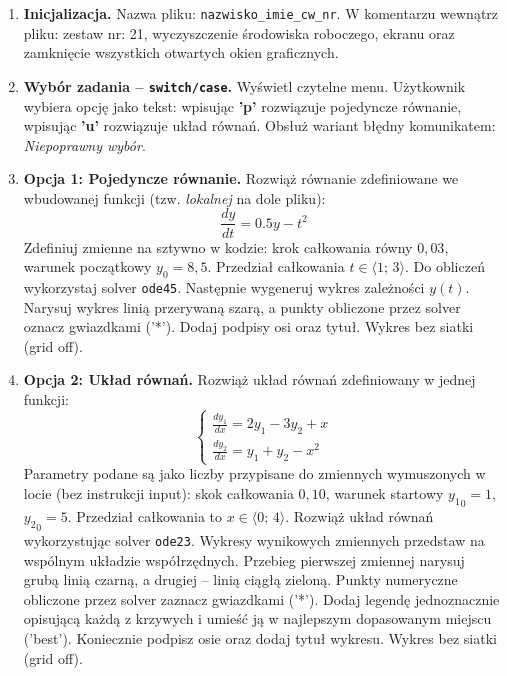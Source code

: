 \documentclass[a4paper,11pt]{article}
\begin{document}
\begin{enumerate}[leftmargin=*, label=\textbf{\arabic*.}, itemsep=2pt]

  \item \textbf{Inicjalizacja.}
    Nazwa pliku: \texttt{nazwisko\_imie\_cw\_nr}. W komentarzu wewnątrz pliku: zestaw nr: 21, wyczyszczenie środowiska roboczego, ekranu oraz zamknięcie wszystkich otwartych okien graficznych.

  \item \textbf{Wybór zadania -- \texttt{switch/case}.}
    Wyświetl czytelne menu. Użytkownik wybiera opcję jako tekst: wpisując \textbf{'p'} rozwiązuje pojedyncze równanie, wpisując \textbf{'u'} rozwiązuje układ równań. Obsłuż wariant błędny komunikatem: \textit{Niepoprawny wybór}.

  \item \textbf{Opcja 1: Pojedyncze równanie.}
    Rozwiąż równanie zdefiniowane we wbudowanej funkcji (tzw. \textit{lokalnej} na dole pliku):
    \[ \frac{dy}{dt} = 0.5y - t^2 \]
    Zdefiniuj zmienne na sztywno w kodzie: krok całkowania równy $0{,}03$, warunek początkowy $y_0 = 8{,}5$. Przedział całkowania $t \in \langle 1;\,3 \rangle$.
    Do obliczeń wykorzystaj solver \texttt{ode45}. Następnie wygeneruj wykres zależności $y(t)$. Narysuj wykres linią przerywaną szarą, a punkty obliczone przez solver oznacz gwiazdkami ('*'). Dodaj podpisy osi oraz tytuł. Wykres bez siatki (grid off).

  \item \textbf{Opcja 2: Układ równań.}
    Rozwiąż układ równań zdefiniowany w jednej funkcji:\\[-0.5em]
    \[
    \begin{cases}
      \frac{dy_1}{dx} = 2y_1 - 3y_2 + x \\
      \frac{dy_2}{dx} = y_1 + y_2 - x^2
    \end{cases}
    \]
    Parametry podane są jako liczby przypisane do zmiennych wymuszonych w locie (bez instrukcji input): skok całkowania $0{,}10$, warunek startowy $ {y_1}_{0} = 1 $, $ {y_2}_{0} = 5 $. Przedział całkowania to $x \in \langle 0;\,4 \rangle$.
    Rozwiąż układ równań wykorzystując solver \texttt{ode23}. Wykresy wynikowych zmiennych przedstaw na wspólnym układzie współrzędnych. Przebieg pierwszej zmiennej narysuj grubą linią czarną, a drugiej -- linią ciągłą zieloną. Punkty numeryczne obliczone przez solver zaznacz gwiazdkami ('*'). Dodaj legendę jednoznacznie opisującą każdą z krzywych i umieść ją w najlepszym dopasowanym miejscu ('best'). Koniecznie podpisz osie oraz dodaj tytuł wykresu. Wykres bez siatki (grid off).

\end{enumerate}
\end{document}
